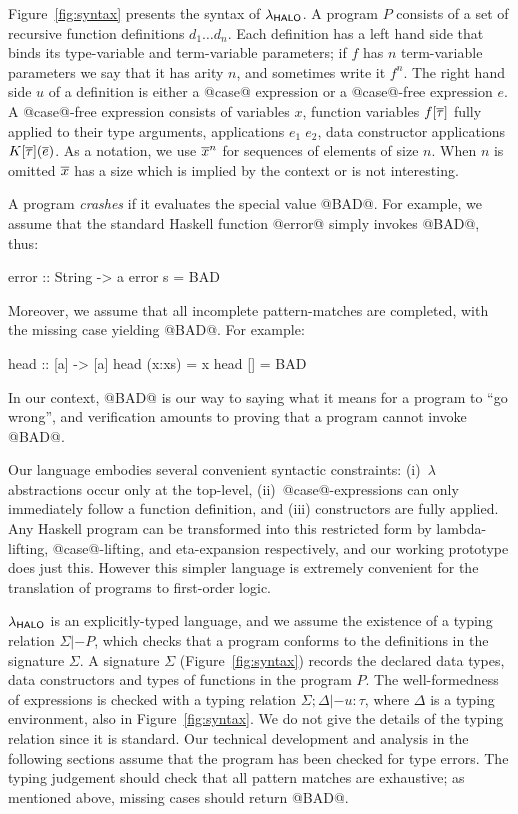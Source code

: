 Figure~\ref{fig:syntax} presents the syntax of $\lambda_{\sf HALO}$.  A program
$P$ consists of a set of recursive function definitions $d_1 \ldots
d_n$. Each definition has a left hand side that binds its type-variable and
term-variable parameters;
if $f$ has $n$ term-variable parameters we say that
it has arity $n$, and sometimes write it $f^n$.
The right hand side $u$ of a definition is either a @case@ expression or a
@case@-free expression $e$.  A @case@-free expression consists of
variables $x$, function variables $f[\overline{\tau}]$ fully applied to their
type arguments, applications $e_1\;e_2$, data constructor applications
$K[\overline{\tau}](\overline{e})$. As a notation, we use
$\overline{x}^{n}$ for sequences of elements of size $n$. When $n$ is
omitted $\overline{x}$ has a size which is implied by the context or is not
interesting.

A program \emph{crashes} if it evaluates the special value @BAD@.
For example, we assume that the standard Haskell function @error@
simply invokes @BAD@, thus:
\begin{code}
  error :: String -> a
  error s = BAD
\end{code}
Moreover, we assume that all incomplete pattern-matches are completed, with the
missing case yielding @BAD@.  For example:
\begin{code}
  head :: [a] -> [a]
  head (x:xs) = x
  head []     = BAD
\end{code}
In our context, @BAD@ is our way to saying what it means for a program to ``go wrong'',
and verification amounts to proving that a program cannot invoke @BAD@.

Our language embodies several convenient syntactic constraints:
(i)~$\lambda$ abstractions occur only at the top-level,
(ii)~@case@-expressions can only immediately follow a function
definition, and (iii) constructors are fully applied.
Any Haskell program can be transformed into this restricted
form by lambda-lifting, @case@-lifting, and eta-expansion respectively,
and our working prototype does just this.
However this simpler language is extremely
convenient for the translation of programs to first-order logic.

$\lambda_{\sf HALO}$ is an explicitly-typed language, and we assume the existence
of a typing relation $\Sigma |- P$, which checks that a program
conforms to the definitions in the signature $\Sigma$. A signature
$\Sigma$ (Figure~\ref{fig:syntax}) records the declared data types,
data constructors and types of functions in the program $P$. The
well-formedness of expressions is checked with a typing relation
$\Sigma;\Delta |- u : \tau$, where $\Delta$ is a typing environment,
also in Figure~\ref{fig:syntax}.  We do not give the details of the
typing relation since it is standard.
Our technical development and analysis in the following sections
assume that the program has been checked for type errors.
The typing judgement should check that all pattern matches are
exhaustive; as mentioned above, missing cases should return @BAD@.

